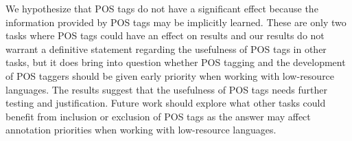 We hypothesize that POS tags do not have a significant effect because the information provided by POS tags may be implicitly learned. These are only two tasks where POS tags could have an effect on results and our results do not warrant a definitive statement regarding the usefulness of POS tags in other tasks, but it does bring into question whether POS tagging and the development of POS taggers should be given early priority when working with low-resource languages. The results suggest that the usefulness of POS tags needs further testing and justification. Future work should explore what other tasks could benefit from inclusion or exclusion of POS tags as the answer may affect annotation priorities when working with low-resource languages.



 

